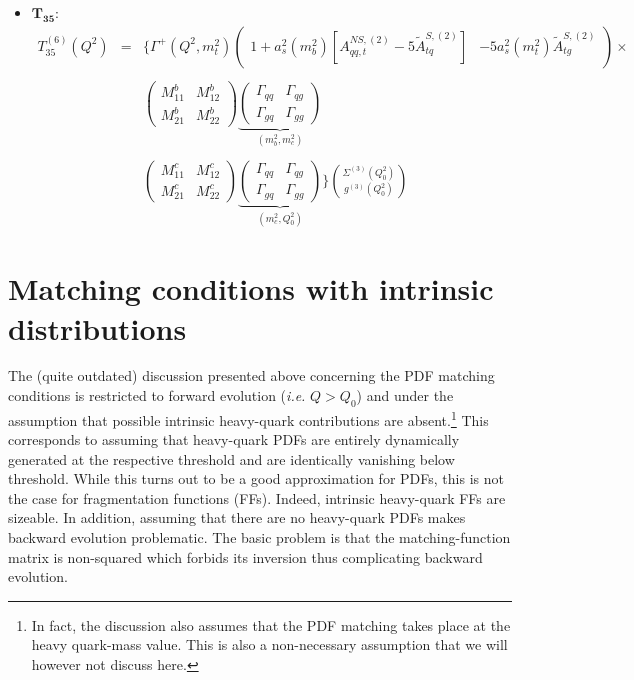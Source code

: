 \documentclass[10pt,a4paper]{article}
\begin{document}
\begin{itemize}
\begin{equation}
\end{equation}
\item $\mathbf{T_{35}}$:
\begin{equation}
\begin{array}{rcl}
T^{(6)}_{35}(Q^2)&=&\displaystyle \Big\{\Gamma^{+}(Q^2,m_t^2)\begin{pmatrix} 1+a_s^2(m_b^2)[A_{qq,t}^{N\!S,(2)}-5\tilde{A}^{S,(2)}_{tq}] & -5a_s^2(m_t^2)\tilde{A}^{S,(2)}_{tg}\end{pmatrix}\times\\
\\
& &\displaystyle\begin{pmatrix} M_{11}^b & M_{12}^b \\ M_{21}^b & M_{22}^b\end{pmatrix}\underbrace{\begin{pmatrix} \Gamma_{qq}& \Gamma_{qg} \\ \Gamma_{gq}& \Gamma_{gg}\end{pmatrix}}_{(m_b^2,m_c^2)}\\
\\
& &\displaystyle\begin{pmatrix} M_{11}^c & M_{12}^c \\ M_{21}^c & M_{22}^c\end{pmatrix}\underbrace{\begin{pmatrix} \Gamma_{qq}& \Gamma_{qg} \\ \Gamma_{gq}& \Gamma_{gg}\end{pmatrix}}_{(m_c^2,Q_0^2)}\Bigg\}{\Sigma^{(3)}(Q_0^2) \choose g^{(3)}(Q_0^2)}
\end{array}
\end{equation}
\end{itemize}

\section{Matching conditions with intrinsic distributions}

The (quite outdated) discussion presented above concerning the PDF
matching conditions is restricted to forward evolution (\textit{i.e.}
$Q>Q_0$) and under the assumption that possible intrinsic heavy-quark
contributions are absent.\footnote{In fact, the discussion also
  assumes that the PDF matching takes place at the heavy quark-mass
  value. This is also a non-necessary assumption that we will however
  not discuss here.} This corresponds to assuming that heavy-quark
PDFs are entirely dynamically generated at the respective threshold
and are identically vanishing below threshold. While this turns out to
be a good approximation for PDFs, this is not the case for
fragmentation functions (FFs). Indeed, intrinsic heavy-quark FFs are
sizeable. In addition, assuming that there are no heavy-quark PDFs
makes backward evolution problematic. The basic problem is that the
matching-function matrix is non-squared which forbids its inversion
thus complicating backward evolution.
\end{document}
